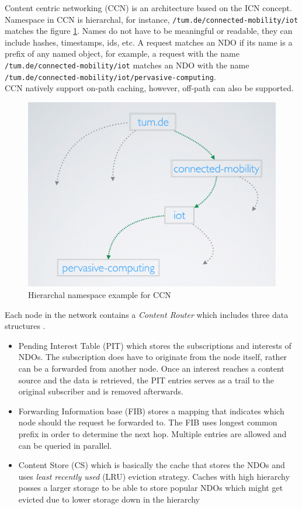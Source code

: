 Content centric networking (CCN) is an architecture based on the ICN concept. Namespace in CCN  is hierarchal, for instance, \verb|/tum.de/connected-mobility/iot| matches the figure \ref{fig:ccn-namespace}. Names do not have to be meaningful or readable, they can include hashes, timestamps, ids, etc. A request matches an NDO if its name is a prefix of any named object, for example,  a request with the name  \verb|/tum.de/connected-mobility/iot| matches an NDO with the name  \verb|/tum.de/connected-mobility/iot/pervasive-computing|.\\ CCN natively support on-path caching, however, off-path can also be supported\cite{6563278}.
\begin{figure}[H]
	\centering
	\includegraphics[scale=0.3]{images/namespace.png}
	\caption{Hierarchal namespace example for CCN}
	\label{fig:ccn-namespace}
\end{figure}

Each node in the network contains a \textit{Content Router} which includes three data structures \cite{6563278}\cite{6231276}. 
\begin{itemize}
\item Pending Interest Table (PIT) which stores the subscriptions and interests of NDOs. The subscription does have to originate  from the node itself, rather can be a forwarded from another node. Once an interest reaches a content source and the data is retrieved, the PIT entries serves as a trail to the original subscriber and is removed afterwards.

\item Forwarding Information base (FIB)  stores a mapping that indicates which node should the request be forwarded to. The FIB uses longest common prefix in order to determine the next hop. Multiple entries are allowed and can be queried in parallel.
\item Content Store (CS) which is basically the cache that stores the NDOs and uses \textit{least recently used} (LRU) eviction strategy. Caches with high hierarchy posses a larger storage to be able to store popular NDOs which might get evicted due to  lower storage down in the hierarchy
\end{itemize}  

